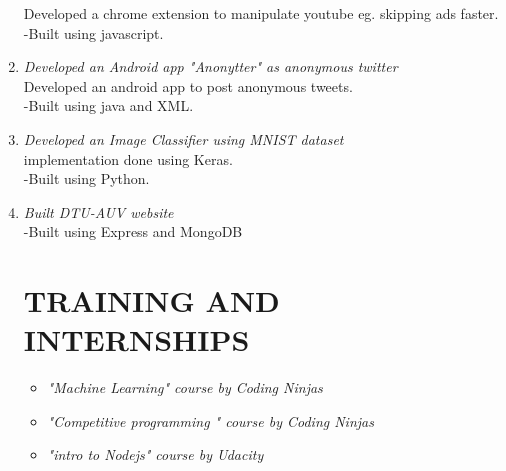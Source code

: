 \documentclass[margin]{res}
\begin{document}
\begin{enumerate}
 Developed a chrome extension to manipulate youtube eg. skipping ads faster.\\
  	-Built using javascript.\\
\item {\large{\sl Developed an Android app "Anonytter" as anonymous twitter}}\\
 Developed an android app to post anonymous tweets.\\
  	-Built using java and XML.\\
\item {\large{\sl Developed an Image Classifier using MNIST dataset}}\\
 implementation done using Keras.\\
  	-Built using Python.\\
\item {\large{\sl Built DTU-AUV website}}\\
 
  	-Built using Express and MongoDB\\

\section{TRAINING AND INTERNSHIPS} \begin{itemize}
 
 \item{\sl  "Machine Learning" course by Coding Ninjas }
 \item{\sl  "Competitive programming " course by Coding Ninjas}
 \item{\sl  "intro to Nodejs" course by Udacity}
 \end{itemize}




	\end{enumerate}
\end{document}
